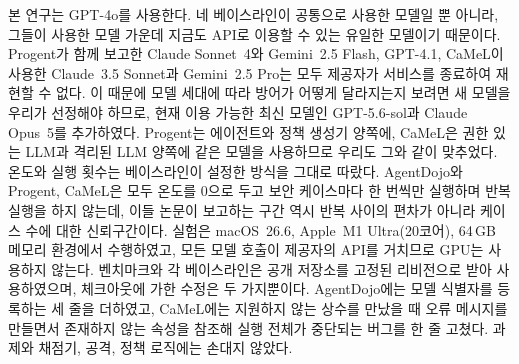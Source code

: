 \documentclass[acmsmall,screen,review,anonymous]{acmart}
\begin{document}
본 연구는 GPT-4o를 사용한다. 네 베이스라인이 공통으로 사용한 모델일 뿐 아니라, 그들이 사용한 모델 가운데 지금도 API로 이용할 수 있는 유일한 모델이기 때문이다. Progent가 함께 보고한 Claude Sonnet~4와 Gemini~2.5 Flash, GPT-4.1, CaMeL이 사용한 Claude~3.5 Sonnet과 Gemini~2.5 Pro는 모두 제공자가 서비스를 종료하여 재현할 수 없다. 이 때문에 모델 세대에 따라 방어가 어떻게 달라지는지 보려면 새 모델을 우리가 선정해야 하므로, 현재 이용 가능한 최신 모델인 GPT-5.6-sol과 Claude Opus~5를 추가하였다. Progent는 에이전트와 정책 생성기 양쪽에, CaMeL은 권한 있는 LLM과 격리된 LLM 양쪽에 같은 모델을 사용하므로 우리도 그와 같이 맞추었다. 온도와 실행 횟수는 베이스라인이 설정한 방식을 그대로 따랐다. AgentDojo와 Progent, CaMeL은 모두 온도를 0으로 두고 보안 케이스마다 한 번씩만 실행하며 반복 실행을 하지 않는데, 이들 논문이 보고하는 구간 역시 반복 사이의 편차가 아니라 케이스 수에 대한 신뢰구간이다. 실험은 macOS~26.6, Apple~M1 Ultra(20코어), 64\,GB 메모리 환경에서 수행하였고, 모든 모델 호출이 제공자의 API를 거치므로 GPU는 사용하지 않는다. 벤치마크와 각 베이스라인은 공개 저장소를 고정된 리비전으로 받아 사용하였으며, 체크아웃에 가한 수정은 두 가지뿐이다. AgentDojo에는 모델 식별자를 등록하는 세 줄을 더하였고, CaMeL에는 지원하지 않는 상수를 만났을 때 오류 메시지를 만들면서 존재하지 않는 속성을 참조해 실행 전체가 중단되는 버그를 한 줄 고쳤다. 과제와 채점기, 공격, 정책 로직에는 손대지 않았다.
\end{document}
